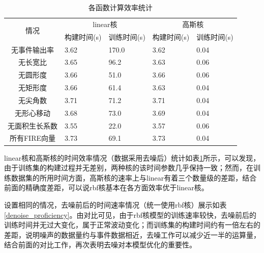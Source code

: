 \begin{table}[ht]
    \centering
    \caption{各函数计算效率统计}
    \begin{tabularx}{\textwidth}{c|X|X|X|X}
    \toprule
    \multicolumn{1}{c|}{\multirow{2}{*}{情况}} & \multicolumn{2}{c|}{linear核} & \multicolumn{2}{c}{高斯核} \\ \cmidrule(l){2-5} 
    \multicolumn{1}{c|}{}  & 构建时间(s)     & 训练时间(s)    & 构建时间(s)     & 训练时间(s)  \\
    \midrule
    无事件输出率      &3.62       &170.0      &3.62       &0.04       \\
    无长宽比         &3.65       &96.2       &3.63       &0.06       \\
    无圆形度         &3.66       &51.0       &3.66       &0.06       \\
    无矩形度         &3.66       &61.4       &3.63       &0.04       \\
    无尖角数         &3.71       &71.2       &3.71       &0.04       \\
    无形心移动       &3.68       &73.0       &3.69       &0.04       \\
    无面积生长系数    &3.55       &22.0       &3.57       &0.06       \\
    所有FIRE向量     &3.73       &69.1       &3.73       &0.04       \\
    \bottomrule
    \end{tabularx}
    \label{kernel_proficiency}
\end{table}

linear核和高斯核的时间效率情况（数据采用去噪后）统计如表\ref{kernel_proficiency}所示，可以发现，由于训练集的构建过程并无差别，两种核的该时间参数几乎保持一致；然而，在训练数据集的所用时间方面，高斯核的速率上与linear有着三个数量级的差距，结合前面的精确度差距，可以说rbf核基本在各方面效率优于linear核。

设置相同的情况，去噪前后的时间速率情况（统一使用rbf核）展示如表\ref{denoise_proficiency}。由对比可见，由于rbf核模型的训练速率较快，去噪前后的训练时间并无过大变化，属于正常波动变化；而训练集的构建时间约有一倍左右的差距，说明噪声的数据量约与事件数据相近，去噪工作可以减少近一半的运算量，结合前面的对比工作，再次表明去噪对本模型优化的重要性。

